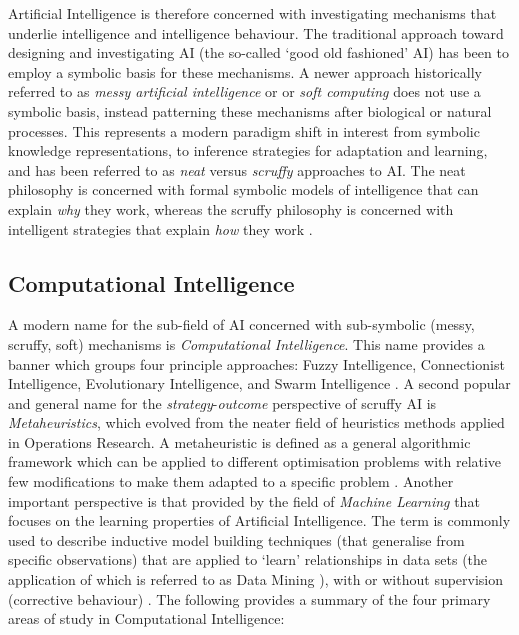 Artificial Intelligence is therefore concerned with investigating mechanisms that underlie intelligence and intelligence behaviour. The traditional approach toward designing and investigating AI (the so-called `good old fashioned' AI) has been to employ a symbolic basis for these mechanisms. A newer approach historically referred to as \emph{messy artificial intelligence} or or \emph{soft computing} does not use a symbolic basis, instead patterning these mechanisms after biological or natural processes. This represents a modern paradigm shift in interest from symbolic knowledge representations, to inference strategies for adaptation and learning, and has been referred to as \emph{neat} versus \emph{scruffy} approaches to AI. The neat philosophy is concerned with formal symbolic models of intelligence that can explain \emph{why} they work, whereas the scruffy philosophy is concerned with intelligent strategies that explain \emph{how} they work \cite{Sloman1990}.


%
%
\subsection{Computational Intelligence}
A modern name for the sub-field of AI concerned with sub-symbolic (messy, scruffy, soft) mechanisms is \emph{Computational Intelligence}. This name provides a banner which groups four principle approaches: Fuzzy Intelligence, Connectionist Intelligence, Evolutionary Intelligence, and Swarm Intelligence \cite{Engelbrecht2002, Pedrycz1997}. 
A second popular and general name for the \emph{strategy}-\emph{outcome} perspective of scruffy AI is \emph{Metaheuristics}, which evolved from the neater field of heuristics methods applied in Operations Research. A metaheuristic is defined as a general algorithmic framework which can be applied to different optimisation problems with relative few modifications to make them adapted to a specific problem \cite{Blum2003}. 
Another important perspective is that provided by the field of \emph{Machine Learning} that focuses on the learning properties of Artificial Intelligence. The term is commonly used to describe inductive model building techniques (that generalise from specific observations) that are applied to `learn' relationships in data sets (the application of which is referred to as Data Mining \cite{Witten2000}), with or without supervision (corrective behaviour) \cite{Michalski1983}. 
The following provides a summary of the four primary areas of study in Computational Intelligence:

